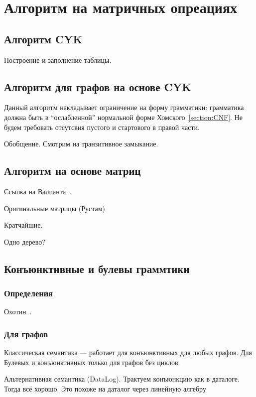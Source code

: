 \section{Алгоритм на матричных опреациях}

\subsection{Алгоритм CYK}

Построение и заполнение таблицы.

\subsection{Алгоритм для графов на основе CYK}

Данный алгоритм накладывает ограничение на форму грамматики: грамматика должна быть в ``ослабленной'' нормальной форме Хомского~\ref{section:CNF}.
Не будем требовать отсутсвия пустого и стартового в правой части.

Обобщение.
Смотрим на транзитивное замыкание.

\subsection{Алгоритм на основе матриц}

Ссылка на Валианта~\cite{!!!}.

Оригинальные матрицы (Рустам)~\cite{Azimov:2018:CPQ:3210259.3210264}

Кратчайшие.

Одно дерево?

\subsection{Конъюнктивные и булевы граммтики}

\subsubsection{Определения}

Охотин~\cite{!!!}.

\subsubsection{Для графов}

Классическая семантика --- работает для конъюнктивных для любых графов.
Для Булевых и конъюнктивных только для графов без циклов.

Альтернативная семантика (DataLog).
Трактуем конъюнкцию как в даталоге. Тогда всё хорошо.
Это похоже на даталог через линейную алгебру~\cite{!!!}

